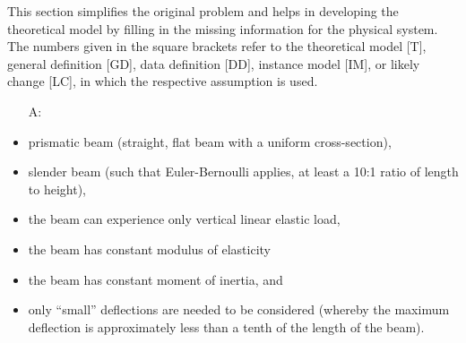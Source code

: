 \documentclass[12pt]{article}
\newcounter{assumpnum} %
\begin{document}

This section simplifies the original problem and helps in developing the
theoretical model by filling in the missing information for the physical
system. The numbers given in the square brackets refer to the theoretical model
    [T], general definition [GD], data definition [DD], instance model [IM], or
likely change [LC], in which the respective assumption is used.

\begin{itemize}

    \item[A\refstepcounter{assumpnum}\theassumpnum \label{A_meaningfulLabel}:]

\end{itemize}

\begin{itemize}
    
    \item prismatic beam (straight, flat beam with a uniform cross-section),
    
    \item slender beam (such that Euler-Bernoulli applies, at least a 10:1 ratio
          of length to height),

    \item the beam can experience only vertical linear elastic load, 
    
    \item the beam has constant modulus of elasticity
    
    \item the beam has constant moment of inertia, and

    \item only ``small'' deflections are needed to be considered (whereby the
        maximum deflection is approximately less than a tenth of the length of
        the beam).

\end{itemize}
\end{document}
